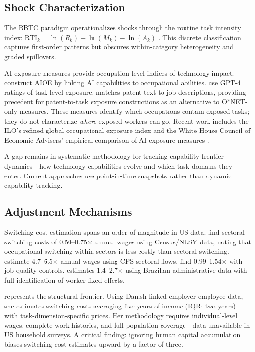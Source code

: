 \documentclass[12pt]{article}
\begin{document}
\subsection{Shock Characterization}
\label{subsec:lit-shocks}


The RBTC paradigm operationalizes shocks through the routine task intensity index: $\text{RTI}_k = \ln(R_k) - \ln(M_k) - \ln(A_k)$ \citep{AutorDorn2013}. This discrete classification captures first-order patterns but obscures within-category heterogeneity and graded spillovers.

AI exposure measures provide occupation-level indices of technology impact. \citet{FeltenRajSeamans2021} construct AIOE by linking AI capabilities to occupational abilities. \citet{EloundouEtAl2024} use GPT-4 ratings of task-level exposure. \citet{Webb2020} matches patent text to job descriptions, providing precedent for patent-to-task exposure constructions as an alternative to O*NET-only measures. These measures identify which occupations contain exposed tasks; they do not characterize \emph{where} exposed workers can go. Recent work includes the ILO's refined global occupational exposure index \citep{ILO2025} and the White House Council of Economic Advisers' empirical comparison of AI exposure measures \citep{WhiteHouse2024}.

A gap remains in systematic methodology for tracking capability frontier dynamics---how technology capabilities evolve and which task domains they enter. Current approaches use point-in-time snapshots rather than dynamic capability tracking.


\subsection{Adjustment Mechanisms}
\label{subsec:lit-mechanisms}


Switching cost estimation spans an order of magnitude in US data. \citet{LeeWolpin2006} find sectoral switching costs of 0.50--0.75$\times$ annual wages using Census/NLSY data, noting that occupational switching within sectors is less costly than sectoral switching. \citet{ArtucChaudhuriMcLaren2010} estimate 4.7--6.5$\times$ annual wages using CPS sectoral flows. \citet{ArtucMcLaren2015} find 0.99--1.54$\times$ with job quality controls. \citet{DixCarneiro2014} estimates 1.4--2.7$\times$ using Brazilian administrative data with full identification of worker fixed effects.

\citet{Traiberman2019} represents the structural frontier. Using Danish linked employer-employee data, she estimates switching costs averaging five years of income (IQR: two years) with task-dimension-specific prices. Her methodology requires individual-level wages, complete work histories, and full population coverage---data unavailable in US household surveys. A critical finding: ignoring human capital accumulation biases switching cost estimates upward by a factor of three.
\end{document}
